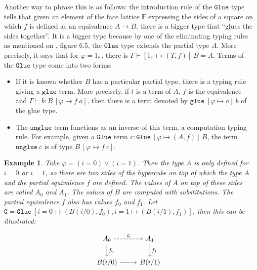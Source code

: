 \documentclass[12pt,a4paper,twoside,xetex]{book} %
\newtheorem{example}[theorem]{Example}
\newcommand{\op}[1]{\mathtt{#1}}
\begin{document}
 


Another way to phrase this is as follows: the introduction rule of the $\op{Glue}$ type tells that given an element of 
the face lattice $\mathbb{F}$ expressing the sides of a square on which $f$ is 
defined as an equivalence $A\rightarrow B$, there is a bigger type that ``glues 
the sides together''. It is a bigger type because by one of the eliminating typing rules as mentioned on \cite{Huber2016}, figure 6.5, the 
$\op{Glue}$ type extends the partial type $A$. More precisely, it says that for 
$\varphi = 1_{\mathbb{F}}$, there is $\Gamma \vdash \left[ 1_{\mathbb{F}} 
\mapsto (T,f) \right] \ B = A$. Terms of the $\op{Glue}$ type come into two 
forms:

\begin{itemize}
\item If it is known whether $B$ has a particular partial type, there is a typing 
rule giving a $\op{glue}$ term. More precisely, if $t$ is a term of $A$, $f$ 
is the equivalence and $\Gamma \vdash b : B \  \left[ \varphi \mapsto f \ a 
\right]$, then there is a term denoted by $\op{glue} \ [\varphi \mapsto a ] \ 
b$ of the glue type. 
\item The $\op{unglue}$ term functions as an inverse of this term, a computation typing rule. For example, given a $\op{Glue}$ term $c : \op{Glue} \ 
[\varphi \mapsto (A,f)] \ B$, the term $\op{unglue} \ c$ is of type $B \ 
[\varphi \mapsto f\ c]$.
\end{itemize}

\begin{example}

Take $\varphi = (i=0) \vee (i=1)$. Then the type $A$ is only defined for $i = 
0$ or $i =1$, so there are two sides of the hypercube on top of which the type $A$  and the partial equivalence $f$ are
defined. The values of $A$ on top of these sides are called $A_0$ and $A_1$. The 
values of $B$ are computed with substitutions. The partial equivalence $f$ also has 
values $f_0$ and $f_1$. Let $\op{G} = \op{Glue} \  [i = 0 \mapsto 
(B(i/0),f_0), i=1 \mapsto (B(i/1), f_1)]$, then this can be illustrated:

\[ \begin{tikzcd}
A_0 \arrow[r, dashed, "\op{G}" ] \arrow[d, "f_0"]	
& A_1  \arrow[d, "f_1"]  \\
B(i/0) 	
	\arrow[r, ""]
& B(i/1)  
\end{tikzcd}
\]


\end{example}
\end{document}

